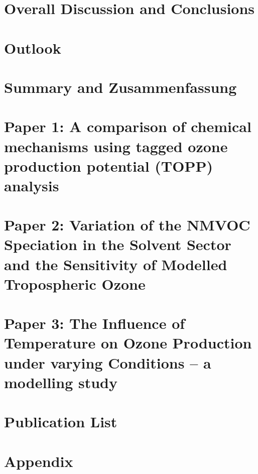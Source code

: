 \documentclass[12pt,twoside,openright,a4paper]{report}
\begin{document}
\chapter{Overall Discussion and Conclusions} \label{c:conclusions}

\clearpage{\pagestyle{empty}\cleardoublepage}

\chapter{Outlook} \label{c:outlook}

\clearpage{\pagestyle{empty}\cleardoublepage}

\chapter{Summary and Zusammenfassung} \label{c:summary}

\clearpage{\pagestyle{empty}\cleardoublepage}


 
\clearpage{\pagestyle{empty}\cleardoublepage}

\chapter{Paper 1: A comparison of chemical mechanisms using tagged ozone production potential (TOPP) analysis} \label{c:paper_1}
\clearpage{\pagestyle{empty}\cleardoublepage}



\chapter{Paper 2: Variation of the NMVOC Speciation in the Solvent Sector and the Sensitivity of Modelled Tropospheric Ozone} \label{c:paper_2}
\clearpage{\pagestyle{empty}\cleardoublepage}



\chapter{Paper 3: The Influence of Temperature on Ozone Production under varying  Conditions -- a modelling study} \label{c:paper_3}
\clearpage{\pagestyle{empty}\cleardoublepage}

\chapter{Publication List}

\clearpage{\pagestyle{empty}\cleardoublepage}

\chapter*{Appendix}
\clearpage{\pagestyle{empty}\cleardoublepage}
\end{document}
